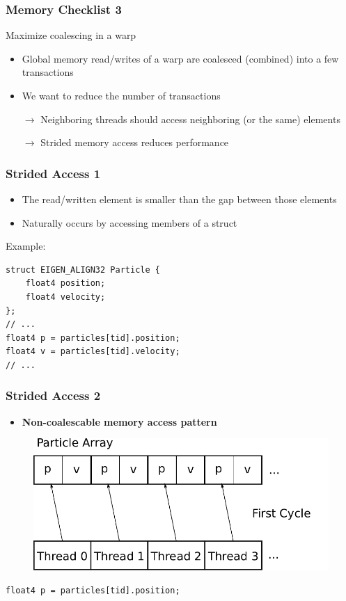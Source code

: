 \documentclass[aspectratio=169,handout]{beamer}
\begin{document}
\begin{frame}[fragile]
\frametitle{Memory Checklist 3}
\begin{mdframed}[]
Maximize coalescing in a warp
\end{mdframed}
\vspace{0.3cm}
\begin{itemize}
\item Global memory read/writes of a warp are coalesced (combined) into a few transactions
\item We want to reduce the number of transactions
\item[$\rightarrow$] Neighboring threads should access neighboring (or the same) elements
\item[$\rightarrow$] Strided memory access reduces performance
\end{itemize}
\end{frame}

\begin{frame}[fragile]
	\frametitle{Strided Access 1}
	\begin{itemize}
	\item The read/written element is smaller than the gap between those elements
	\item Naturally occurs by accessing members of a struct
\end{itemize}
Example:
\begin{lstlisting}       
struct EIGEN_ALIGN32 Particle {
	float4 position;
	float4 velocity;
};  
// ...
float4 p = particles[tid].position;
float4 v = particles[tid].velocity;
// ...
\end{lstlisting} 
\end{frame}


\begin{frame}[fragile]
	\frametitle{Strided Access 2}
	\begin{itemize}
	\item 	\textbf{Non-coalescable memory access pattern}
\end{itemize}
	\begin{figure}
		\centering
		\includegraphics[height=0.5\textheight]{accessParticle1}
	\end{figure}
\begin{lstlisting}             
float4 p = particles[tid].position;
\end{lstlisting} 
\end{frame}
\end{document}
